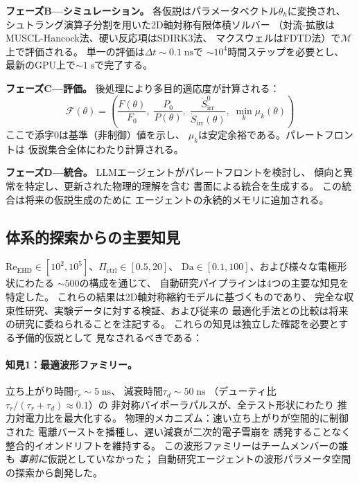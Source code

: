 \documentclass[12pt,twocolumn]{ltjsarticle}
\newcommand{\Sdot}{\dot{S}_{\mathrm{irr}}}
\newcommand{\Reehd}{\mathrm{Re}_{\mathrm{EHD}}}
\newcommand{\Pctrl}{\Pi_{\mathrm{ctrl}}}
\begin{document}
\textbf{フェーズB---シミュレーション。}
各仮説はパラメータベクトル$\theta_h$に変換され、
シュトラング演算子分割を用いた2D軸対称有限体積ソルバー
（対流-拡散はMUSCL-Hancock法、硬い反応項はSDIRK3法、
マクスウェルはFDTD法）で$\mathcal{M}$上で評価される。
単一の評価は$\Delta t \sim 0.1\;\mathrm{ns}$で
$\sim 10^4$時間ステップを必要とし、
最新のGPU上で$\sim 1\;\mathrm{s}$で完了する。

\textbf{フェーズC---評価。}
後処理により多目的適応度が計算される：
\begin{equation}
  \mathcal{F}(\theta) = \left(
    \frac{F(\theta)}{F_0},\;
    \frac{P_0}{P(\theta)},\;
    \frac{\Sdot^0}{\Sdot(\theta)},\;
    \min_k \mu_k(\theta)
  \right)
  \label{eq:fitness}
\end{equation}
ここで添字0は基準（非制御）値を示し、
$\mu_k$は安定余裕である。パレートフロントは
仮説集合全体にわたり計算される。

\textbf{フェーズD---統合。}
LLMエージェントがパレートフロントを検討し、
傾向と異常を特定し、更新された物理的理解を含む
書面による統合を生成する。
この統合は将来の仮説生成のために
エージェントの永続的メモリに追加される。

\subsection{体系的探索からの主要知見}
\label{sec:autoresearch:findings}

$\Reehd \in [10^2, 10^5]$、$\Pctrl \in [0.5, 20]$、
$\mathrm{Da} \in [0.1, 100]$、および様々な電極形状にわたる
$\sim 500$の構成を通じて、
自動研究パイプラインは4つの主要な知見を特定した。
これらの結果は2D軸対称縮約モデルに基づくものであり、
完全な収束性研究、実験データに対する検証、および従来の
最適化手法との比較は将来の研究に委ねられることを注記する。
これらの知見は独立した確認を必要とする予備的仮説として
見なされるべきである：

\paragraph{知見1：最適波形ファミリー。}
立ち上がり時間$\tau_r \sim 5\;\mathrm{ns}$、
減衰時間$\tau_d \sim 50\;\mathrm{ns}$
（デューティ比$\tau_r/(\tau_r + \tau_d) \approx 0.1$）の
非対称バイポーラパルスが、全テスト形状にわたり
推力対電力比を最大化する。
物理的メカニズム：速い立ち上がりが空間的に制御された
電離バーストを播種し、遅い減衰が二次的電子雪崩を
誘発することなく整合的イオンドリフトを維持する。
この波形ファミリーはチームメンバーの誰も
\textit{事前に}仮説としていなかった；
自動研究エージェントの波形パラメータ空間の探索から創発した。
\end{document}
